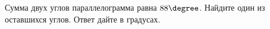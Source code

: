 \begin{ex}
	\begin{condition}
		Сумма двух углов параллелограмма равна \( 88\degree \). Найдите один из оставшихся углов. Ответ дайте в градусах.
	\end{condition}
\end{ex}